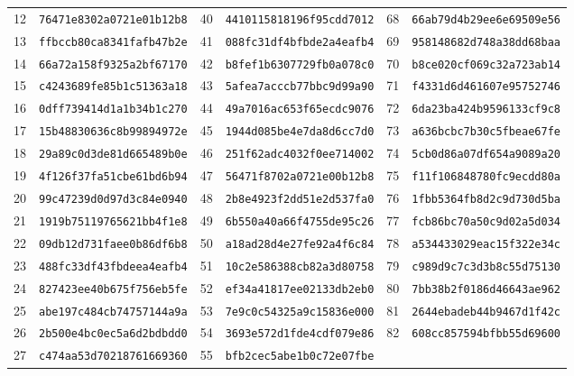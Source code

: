 \begin{table}[t]
\begin{tabular}{@{}cl | cl | cl@{}}
12 & \texttt{76471e8302a0721e01b12b8} & 40 & \texttt{4410115818196f95cdd7012} & 68 & \texttt{66ab79d4b29ee6e69509e56} \\
13 & \texttt{ffbccb80ca8341fafb47b2e} & 41 & \texttt{088fc31df4bfbde2a4eafb4} & 69 & \texttt{958148682d748a38dd68baa} \\
14 & \texttt{66a72a158f9325a2bf67170} & 42 & \texttt{b8fef1b6307729fb0a078c0} & 70 & \texttt{b8ce020cf069c32a723ab14} \\
15 & \texttt{c4243689fe85b1c51363a18} & 43 & \texttt{5afea7acccb77bbc9d99a90} & 71 & \texttt{f4331d6d461607e95752746} \\
16 & \texttt{0dff739414d1a1b34b1c270} & 44 & \texttt{49a7016ac653f65ecdc9076} & 72 & \texttt{6da23ba424b9596133cf9c8} \\
17 & \texttt{15b48830636c8b99894972e} & 45 & \texttt{1944d085be4e7da8d6cc7d0} & 73 & \texttt{a636bcbc7b30c5fbeae67fe} \\
18 & \texttt{29a89c0d3de81d665489b0e} & 46 & \texttt{251f62adc4032f0ee714002} & 74 & \texttt{5cb0d86a07df654a9089a20} \\
19 & \texttt{4f126f37fa51cbe61bd6b94} & 47 & \texttt{56471f8702a0721e00b12b8} & 75 & \texttt{f11f106848780fc9ecdd80a} \\
20 & \texttt{99c47239d0d97d3c84e0940} & 48 & \texttt{2b8e4923f2dd51e2d537fa0} & 76 & \texttt{1fbb5364fb8d2c9d730d5ba} \\
21 & \texttt{1919b75119765621bb4f1e8} & 49 & \texttt{6b550a40a66f4755de95c26} & 77 & \texttt{fcb86bc70a50c9d02a5d034} \\
22 & \texttt{09db12d731faee0b86df6b8} & 50 & \texttt{a18ad28d4e27fe92a4f6c84} & 78 & \texttt{a534433029eac15f322e34c} \\
23 & \texttt{488fc33df43fbdeea4eafb4} & 51 & \texttt{10c2e586388cb82a3d80758} & 79 & \texttt{c989d9c7c3d3b8c55d75130} \\
24 & \texttt{827423ee40b675f756eb5fe} & 52 & \texttt{ef34a41817ee02133db2eb0} & 80 & \texttt{7bb38b2f0186d46643ae962} \\
25 & \texttt{abe197c484cb74757144a9a} & 53 & \texttt{7e9c0c54325a9c15836e000} & 81 & \texttt{2644ebadeb44b9467d1f42c} \\
26 & \texttt{2b500e4bc0ec5a6d2bdbdd0} & 54 & \texttt{3693e572d1fde4cdf079e86} & 82 & \texttt{608cc857594bfbb55d69600} \\
27 & \texttt{c474aa53d70218761669360} & 55 & \texttt{bfb2cec5abe1b0c72e07fbe} &    & \\
\bottomrule
\end{tabular}
\end{table}

